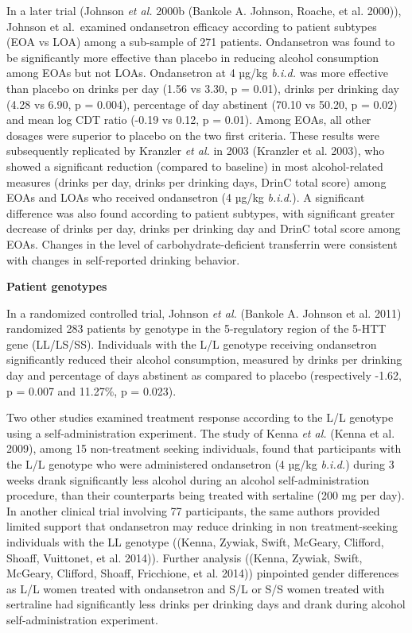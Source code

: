 \documentclass[
  12pt,
]{article}
\begin{document}
In a later trial (Johnson \emph{et al.} 2000b (Bankole A. Johnson,
Roache, et al. 2000)), Johnson et al.~examined ondansetron efficacy
according to patient subtypes (EOA vs LOA) among a sub-sample of 271
patients. Ondansetron was found to be significantly more effective than
placebo in reducing alcohol consumption among EOAs but not LOAs.
Ondansetron at 4 µg/kg \emph{b.i.d.} was more effective than placebo on
drinks per day (1.56 vs 3.30, p = 0.01), drinks per drinking day (4.28
vs 6.90, p = 0.004), percentage of day abstinent (70.10 vs 50.20, p =
0.02) and mean log CDT ratio (-0.19 vs 0.12, p = 0.01). Among EOAs, all
other dosages were superior to placebo on the two first criteria. These
results were subsequently replicated by Kranzler \emph{et al.} in 2003
(Kranzler et al. 2003), who showed a significant reduction (compared to
baseline) in most alcohol-related measures (drinks per day, drinks per
drinking days, DrinC total score) among EOAs and LOAs who received
ondansetron (4 µg/kg \emph{b.i.d.}). A significant difference was also
found according to patient subtypes, with significant greater decrease
of drinks per day, drinks per drinking day and DrinC total score among
EOAs. Changes in the level of carbohydrate-deficient transferrin were
consistent with changes in self-reported drinking behavior.

\textbf{Patient genotypes}

In a randomized controlled trial, Johnson \emph{et al.} (Bankole A.
Johnson et al. 2011) randomized 283 patients by genotype in the
5\textquotesingle-regulatory region of the 5-HTT gene (LL/LS/SS).
Individuals with the L/L genotype receiving ondansetron significantly
reduced their alcohol consumption, measured by drinks per drinking day
and percentage of days abstinent as compared to placebo (respectively
-1.62, p = 0.007 and 11.27\%, p = 0.023).

Two other studies examined treatment response according to the L/L
genotype using a self-administration experiment. The study of Kenna
\emph{et al.} (Kenna et al. 2009), among 15 non-treatment seeking
individuals, found that participants with the L/L genotype who were
administered ondansetron (4 µg/kg \emph{b.i.d.}) during 3 weeks drank
significantly less alcohol during an alcohol self-administration
procedure, than their counterparts being treated with sertaline (200 mg
per day). In another clinical trial involving 77 participants, the same
authors provided limited support that ondansetron may reduce drinking in
non treatment-seeking individuals with the LL genotype ((Kenna, Zywiak,
Swift, McGeary, Clifford, Shoaff, Vuittonet, et al. 2014)). Further
analysis ((Kenna, Zywiak, Swift, McGeary, Clifford, Shoaff, Fricchione,
et al. 2014)) pinpointed gender differences as L/L women treated with
ondansetron and S/L or S/S women treated with sertraline had
significantly less drinks per drinking days and drank during alcohol
self-administration experiment.
\end{document}
